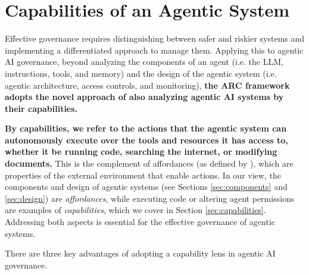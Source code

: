 \documentclass{article}
\begin{document}
\section{Capabilities of an Agentic System}

Effective governance requires distinguishing between safer and riskier systems and implementing a differentiated approach to manage them. Applying this to agentic AI governance, beyond analyzing the components of an agent (i.e. the LLM, instructions, tools, and memory) and the design of the agentic system (i.e. agentic architecture, access controls, and monitoring), \textbf{the ARC framework adopts the novel approach of also analyzing agentic AI systems by their capabilities.}

\textbf{By capabilities, we refer to the actions that the agentic system can autonomously execute over the tools and resources it has access to, whether it be running code, searching the internet, or modifying documents.} This is the complement of affordances (as defined by \citet{gaver_affordances}), which are properties of the external environment that enable actions. In our view, the components and design of agentic systems (see Sections \ref{sec:components} and \ref{sec:design}) are \emph{affordances}, while executing code or altering agent permissions are examples of \emph{capabilities}, which we cover in Section \ref{sec:capabilities}. Addressing both aspects is essential for the effective governance of agentic systems.

There are three key advantages of adopting a capability lens in agentic AI governance. 
\end{document}
